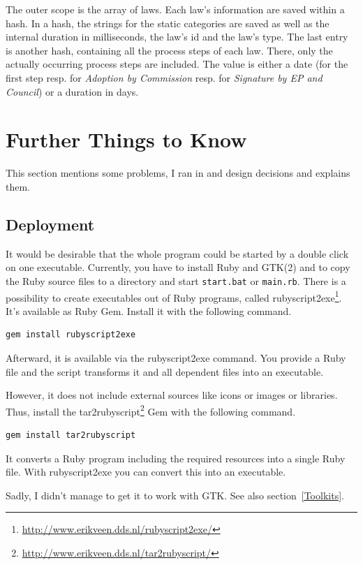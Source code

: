 \documentclass{scrartcl}
\begin{document}
The outer scope is the array of laws. Each law's information are saved within a hash. In a hash, the strings for the static categories are saved as well as the internal duration in milliseconds, the law's id and the law's type. The last entry is another hash, containing all the process steps of each law. There, only the actually occurring process steps are included. The value is either a date (for the first step resp. for \textit{Adoption by Commission} resp. for \textit{Signature by EP and Council}) or a duration in days.






\section{Further Things to Know}
\label{Things to know}
This section mentions some problems, I ran in and design decisions and explains them.


\subsection{Deployment}
\label{Deployment}
It would be desirable that the whole program could be started by a double click on one executable. Currently, you have to install Ruby and GTK(2) and to copy the Ruby source files to a directory and start \texttt{start.bat} or \texttt{main.rb}.
There is a possibility to create executables out of Ruby programs, called rubyscript2exe\footnote{\url{http://www.erikveen.dds.nl/rubyscript2exe/}}. It's available as Ruby Gem. Install it with the following command.
\begin{verbatim}
gem install rubyscript2exe
\end{verbatim}
Afterward, it is available via the rubyscript2exe command. You provide a Ruby file and the script transforms it and all dependent files into an executable.

However, it does not include external sources like icons or images or libraries. Thus, install the tar2rubyscript\footnote{\url{http://www.erikveen.dds.nl/tar2rubyscript/}} Gem with the following command.
\begin{verbatim}
gem install tar2rubyscript
\end{verbatim}

It converts a Ruby program including the required resources into a single Ruby file. With rubyscript2exe you can convert this into an executable.

Sadly, I didn't manage to get it to work with GTK. See also section~\ref{Toolkits}.
\end{document}
